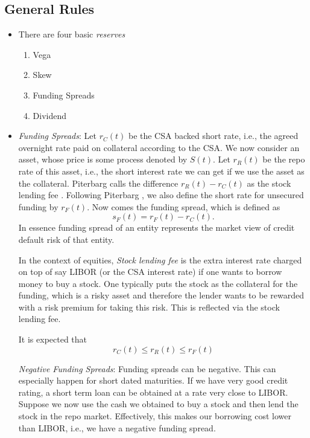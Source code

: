 \documentclass{amsart}
\theoremstyle{plain}
\numberwithin{equation}{section}
\begin{document}
\subsection{General Rules}
\begin{itemize}
	\item There are four basic \emph{reserves}
		\begin{enumerate}
			\item Vega
			\item Skew
			\item Funding Spreads
			\item Dividend
		\end{enumerate}
	\item \emph{Funding Spreads}: Let $r_C(t)$ be the CSA backed
	short rate, i.e., the agreed overnight rate paid on collateral according 
	to the CSA. We now consider an asset, whose price is some process
	denoted by $S(t)$. Let $r_R(t)$ be the repo rate of this asset, i.e., the short interest
	rate we can get if we use the asset as the collateral. Piterbarg calls the difference
	$r_R(t) - r_C(t)$ as the stock lending fee \cite{piterbarg2010funding}. Following 
	Piterbarg \cite{piterbarg2010funding}, we also define the short rate for unsecured
	funding by $r_F(t)$. Now comes the funding spread, which is defined as \cite{piterbarg2010funding}
	$$ s_F(t) = r_F(t) - r_C(t). $$
	In essence funding spread of an entity represents the market view
	of credit default risk of that entity.
	
	In the context of equities, \emph{Stock lending fee} is the extra interest rate charged on top 
	of say LIBOR (or the CSA interest rate) if one wants to  borrow money to buy a stock. One typically puts the stock as the collateral for the funding, which is a risky asset and therefore the lender wants to be rewarded with a risk premium for taking this risk. This is reflected via the stock lending fee.
	
	It is expected that 
		\begin{equation}
	r_C(t) \leq r_R(t) \leq r_F(t)
	\label{eq:csa}
	\end{equation}
	
	\emph{Negative Funding Spreads}: Funding spreads can be negative. This can especially happen
	for short dated maturities. If we have very good credit rating, a short term loan 
	can be obtained at a rate very close to LIBOR. Suppose we now use the cash we obtained
	to buy a stock and then lend the stock in the repo market. Effectively, this makes our
	borrowing cost lower than LIBOR, i.e., we have a negative funding spread. 
	

\end{itemize}
\end{document}
